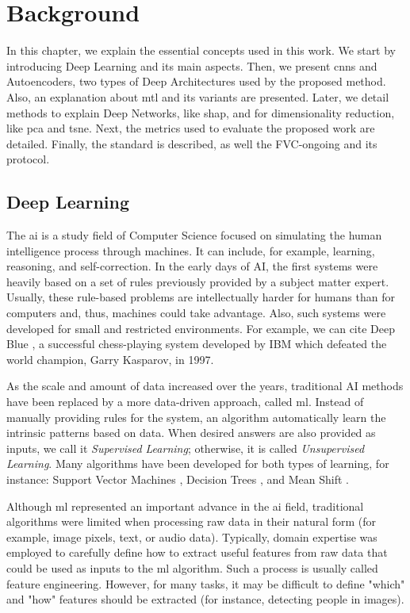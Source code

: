 \section{Background} \label{sec:background}

In this chapter, we explain the essential concepts used in this work. We start by introducing Deep Learning and its main aspects. Then, we present \aclp{cnn} and Autoencoders, two types of Deep Architectures used by the proposed method. Also, an explanation about \acl{mtl} and its variants are presented. Later, we detail methods to explain Deep Networks, like \acs{shap}, and for dimensionality reduction, like \acl{pca} and \acs{tsne}. Next, the metrics used to evaluate the proposed work are detailed. Finally, the \icao standard is described, as well the FVC-ongoing and its protocol.

\subsection{Deep Learning}

The \acf{ai} is a study field of Computer Science focused on simulating the human intelligence process through machines. It can include, for example, learning, reasoning, and self-correction. In the early days of AI, the first systems were heavily based on a set of rules previously provided by a subject matter expert. Usually, these rule-based problems are intellectually harder for humans than for computers and, thus, machines could take advantage. Also, such systems were developed for small and restricted environments. For example, we can cite Deep Blue \citep{hsu2002behind}, a successful chess-playing system developed by IBM which defeated the world champion, Garry Kasparov, in 1997.

As the scale and amount of data increased over the years, traditional AI methods have been replaced by a more data-driven approach, called \acf{ml}. Instead of manually providing rules for the system, an algorithm automatically learn the intrinsic patterns based on data. When desired answers are also provided as inputs, we call it \textit{Supervised Learning}; otherwise, it is called \textit{Unsupervised Learning}. Many algorithms have been developed for both types of learning, for instance: Support Vector Machines \citep{boser1992training}, Decision Trees \citep{breiman1984classification}, and Mean Shift \citep{fukunaga1975estimation}. 

Although \acl{ml} represented an important advance in the \acs{ai} field, traditional algorithms were limited when processing raw data in their natural form (for example, image pixels, text, or audio data). Typically, domain expertise was employed to carefully define how to extract useful features from raw data that could be used as inputs to the \acs{ml} algorithm. Such a process is usually called feature engineering. However, for many tasks, it may be difficult to define "which" and "how" features should be extracted (for instance, detecting people in images).

